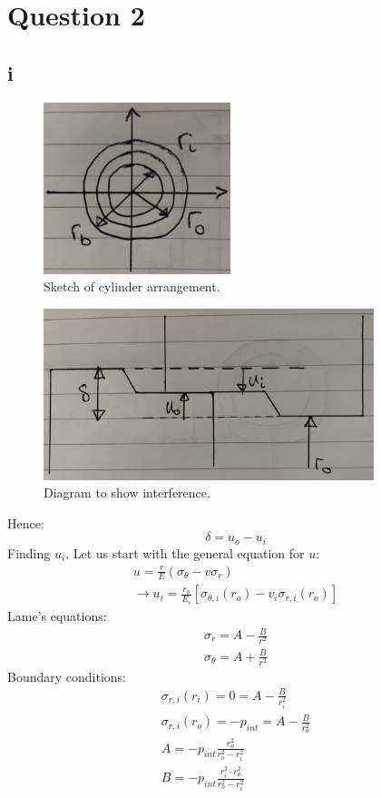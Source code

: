 \documentclass[11pt]{article}
\numberwithin{equation}{section}
\begin{document}
\section{Question 2}
\subsection{i}
\begin{figure}[H]
    \centering
    \includegraphics[height =5cm]{./img/q2i2.jpg}
    \caption{Sketch of cylinder arrangement.}
\end{figure}
\begin{figure}[H]
    \centering
    \includegraphics[height =5cm]{./img/q2i1.jpg}
    \caption{Diagram to show interference.}
\end{figure}
Hence:
\begin{equation}
    \delta = u_o - u_i
\end{equation}
Finding $u_i$. Let us start with the general equation for $u$:
\begin{gather}
    u = \frac{r}{E}\left(\sigma_{\theta} - v \sigma_r\right)\\
    \rightarrow u_i = \frac{r_o}{E_i}\left[\sigma_{\theta, i} \left(r_o\right) - v_i \sigma_{r,i} (r_o)\right]
\end{gather}
Lame's equations:
\begin{gather}
    \sigma_r = A - \frac{B}{r^2}\\
    \sigma_{\theta} = A + \frac{B}{r^2}
\end{gather}
Boundary conditions:
\begin{gather}
    \sigma_{r,i}(r_i) = 0 = A - \frac{B}{r_i^2}\\
    \sigma_{r,i}(r_o) = -p_{int} = A - \frac{B}{r_o^2}\\
    A = -p_{int}\frac{r_o^2}{r_o^2 - r_i^2}\\
    B = -p_{int}\frac{r_i^2 \cdot r_o^2}{r_o^2 - r_i^2}
\end{gather}
\end{document}
